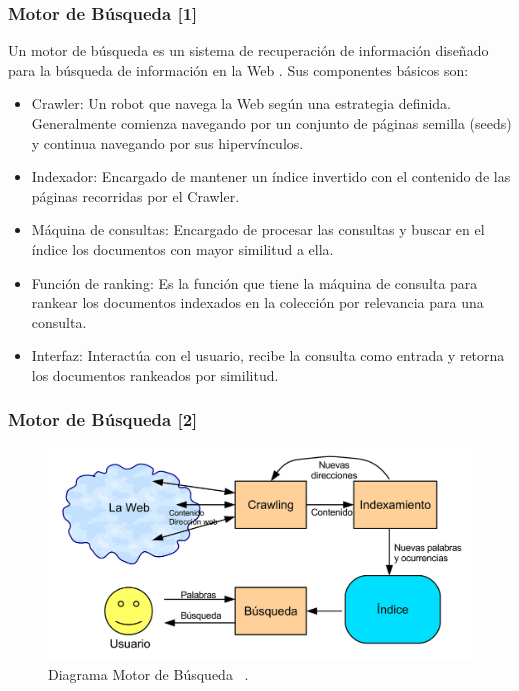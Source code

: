 \documentclass[handout]{beamer}
\begin{document}
\begin{frame}\frametitle{Motor de Búsqueda [1]}


{\footnotesize
  Un motor de búsqueda es un sistema de recuperación de información diseñado para la búsqueda de información en la Web \cite{libroweb2008}. Sus componentes básicos son:


\begin{block}


\begin{itemize}
\item Crawler: Un robot que navega  la Web según una estrategia definida. Generalmente comienza navegando por un conjunto de páginas semilla (seeds) y continua navegando por sus hipervínculos.
\item Indexador: Encargado de mantener un índice invertido con el contenido de las páginas recorridas por el Crawler.
\item Máquina de consultas: Encargado de procesar las  consultas y buscar en el índice los documentos  con mayor similitud a ella.
\item Función de ranking: Es la función que tiene la máquina de consulta para rankear los documentos indexados en la colección por relevancia para una consulta.
\item Interfaz: Interactúa con el usuario, recibe la consulta como entrada y retorna los documentos rankeados por similitud.
 
\end{itemize}

\end{block}
}

\end{frame}


\begin{frame}\frametitle{Motor de Búsqueda [2]}

\begin{figure}[h!]
	\centering
	\includegraphics[scale=0.11]{pics/searchengine.png}
	\caption{ Diagrama Motor de Búsqueda ~\cite{libroweb2008}.}
\end{figure}

\end{frame}
\end{document}
